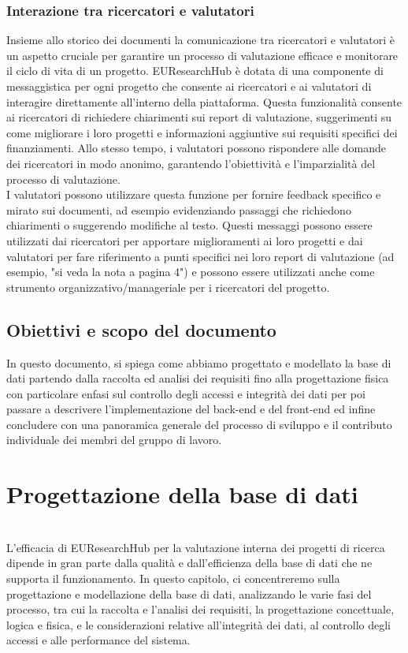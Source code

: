 \documentclass{report}
\begin{document}
\subsection{Interazione tra ricercatori e valutatori}
Insieme allo storico dei documenti la comunicazione tra ricercatori e valutatori è un aspetto cruciale per garantire un processo di valutazione efficace e monitorare il ciclo di vita di un progetto. EUResearchHub è dotata di una componente di messaggistica per ogni progetto che consente ai ricercatori e ai valutatori di interagire direttamente all'interno della piattaforma. Questa funzionalità consente ai ricercatori di richiedere chiarimenti sui report di valutazione, suggerimenti su come migliorare i loro progetti e informazioni aggiuntive sui requisiti specifici dei finanziamenti. Allo stesso tempo, i valutatori possono rispondere alle domande dei ricercatori in modo anonimo, garantendo l'obiettività e l'imparzialità del processo di valutazione.\\
I valutatori possono utilizzare questa funzione per fornire feedback specifico e mirato sui documenti, ad esempio evidenziando passaggi che richiedono chiarimenti o suggerendo modifiche al testo. Questi messaggi possono essere utilizzati dai ricercatori per apportare miglioramenti ai loro progetti e dai valutatori per fare riferimento a punti specifici nei loro report di valutazione (ad esempio, "si veda la nota a pagina 4") e possono essere utilizzati anche come strumento organizzativo/manageriale per i ricercatori del progetto.\\


\section{Obiettivi e scopo del documento}

In questo documento, si spiega come abbiamo progettato e modellato la base di dati partendo dalla raccolta ed analisi dei requisiti fino alla progettazione fisica con particolare enfasi sul controllo degli accessi e integrità dei dati per poi passare a descrivere l'implementazione del back-end e del front-end ed infine concludere con una panoramica generale del processo di sviluppo e il contributo individuale dei membri del gruppo di lavoro.\\


\chapter{Progettazione della base di dati}
\phantom{This text will be invisible}\\
L'efficacia di EUResearchHub per la valutazione interna dei progetti di ricerca dipende in gran parte dalla qualità e dall'efficienza della base di dati che ne supporta il funzionamento. In questo capitolo, ci concentreremo sulla progettazione e modellazione della base di dati, analizzando le varie fasi del processo, tra cui la raccolta e l'analisi dei requisiti, la progettazione concettuale, logica e fisica, e le considerazioni relative all'integrità dei dati, al controllo degli accessi e alle performance del sistema.
\end{document}
